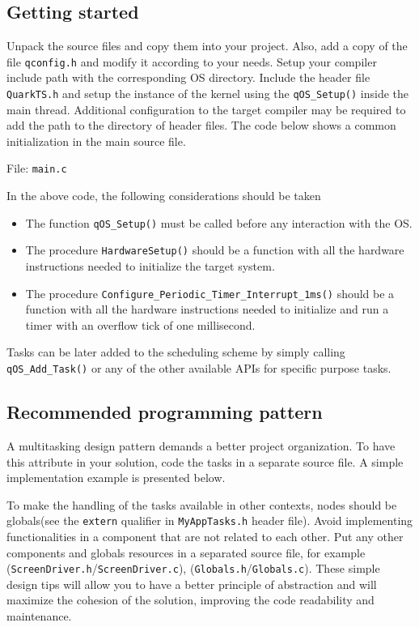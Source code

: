 


\subsection{Getting started}
Unpack the source files and copy them into your project. Also, add a copy of the file \lstinline{qconfig.h} and modify it according to your needs. Setup your compiler include path with the corresponding OS directory. Include the header file \lstinline{QuarkTS.h} and setup the instance of the kernel using the \lstinline{qOS_Setup()} inside the main thread. Additional configuration to the target compiler may be required to add the path to the directory of header files. The code below shows a common initialization in the main source file.
\medskip

File: \lstinline{main.c}



In the above code, the following considerations should be taken
\begin{itemize}
    \item The function \lstinline{qOS_Setup()} must be called before any interaction with the OS.
    \item The procedure \lstinline{HardwareSetup()} should be a function with all the hardware instructions needed to initialize the target system.
    \item  The procedure \lstinline{Configure_Periodic_Timer_Interrupt_1ms()} should be a function with all the hardware instructions needed to initialize and run a timer with an overflow tick of one millisecond.
\end{itemize}

Tasks can be later added to the scheduling scheme by simply calling \lstinline{qOS_Add_Task()} or any of the other available APIs for specific purpose tasks.

\subsection{Recommended programming pattern}
A multitasking design pattern demands a better project organization. To have this attribute in your solution, code the tasks in a separate source file. A simple implementation example is presented below.
\medskip

To make the handling of the tasks available in other contexts, nodes should be globals(see the \lstinline{extern} qualifier in \lstinline{MyAppTasks.h} header file).  Avoid implementing functionalities in a component that are not related to each other. Put any other components and globals resources in a separated source file, for example (\lstinline{ScreenDriver.h}/\lstinline{ScreenDriver.c}),  (\lstinline{Globals.h}/\lstinline{Globals.c}). These simple design tips will allow you to have a better principle of abstraction and will maximize the cohesion of the solution, improving the code readability and maintenance.
\medskip

